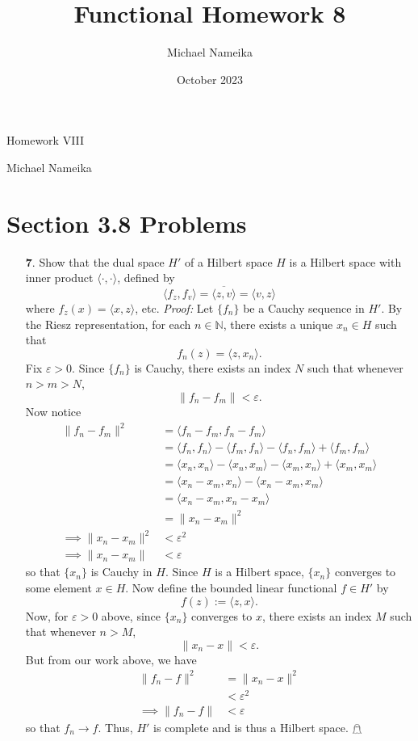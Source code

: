 \documentclass{article}
\title{Functional Homework 8}
\author{Michael Nameika}
\date{October 2023}
\begin{document}
\begin{center}
    {\Huge Homework VIII}
    \vspace{0.5cm}

    {\large Michael Nameika}
\end{center}

\section*{Section 3.8 Problems}
\begin{itemize}
    \item[\textbf{7}.] Show that the dual space $H'$ of a Hilbert space $H$ is a Hilbert space with inner product $\langle \cdot, \cdot \rangle$, defined by 
    \[\langle f_z, f_v\rangle = \overline{\langle z, v\rangle} = \langle v, z \rangle\]
    where $f_z(x) = \langle x, z\rangle$, etc.
    \newline\newline
    \textit{Proof:} Let $\{f_n\}$ be a Cauchy sequence in $H'$. By the Riesz representation, for each $n \in \mathbb{N}$, there exists a unique $x_n \in H$ such that 
    \[f_n(z) = \langle z, x_n \rangle.\]
    Fix $\varepsilon > 0$. Since $\{f_n\}$ is Cauchy, there exists an index $N$ such that whenever $n > m > N$,
    \[\|f_n - f_m\| < \varepsilon.\]
    Now notice
    \begin{align*}
        \|f_n - f_m\|^2 &= \langle f_n - f_m, f_n - f_m\rangle \\
        &= \langle f_n, f_n \rangle - \langle f_m, f_n \rangle - \langle f_n, f_m\rangle + \langle f_m,f_m\rangle\\
        &= \langle x_n, x_n\rangle - \langle x_n, x_m \rangle - \langle x_m, x_n \rangle + \langle x_m, x_m\rangle\\
        &= \langle x_n - x_m, x_n\rangle - \langle x_n - x_m, x_m\rangle\\
        &= \langle x_n - x_m, x_n - x_m\rangle\\
        &= \|x_n - x_m\|^2\\
        \implies \|x_n - x_m\|^2 &< \varepsilon^2\\
        \implies \|x_n - x_m \| &< \varepsilon
    \end{align*}
    so that $\{x_n\}$ is Cauchy in $H$. Since $H$ is a Hilbert space, $\{x_n\}$ converges to some element $x \in H$. Now define the bounded linear functional $f \in H'$ by
    \[f(z) := \langle z, x\rangle. \]
    Now, for $\varepsilon > 0$ above, since $\{x_n\}$ converges to $x$, there exists an index $M$ such that whenever $n > M$,
    \[\|x_n - x\| < \varepsilon.\]
    But from our work above, we have
    \begin{align*}
        \|f_n - f\|^2 &= \|x_n - x\|^2\\
        &< \varepsilon^2\\
        \implies \|f_n - f\| &< \varepsilon
    \end{align*}
    so that $f_n \to f$. Thus, $H'$ is complete and is thus a Hilbert space. \hfill $\mathghost$
\end{itemize}
\end{document}
